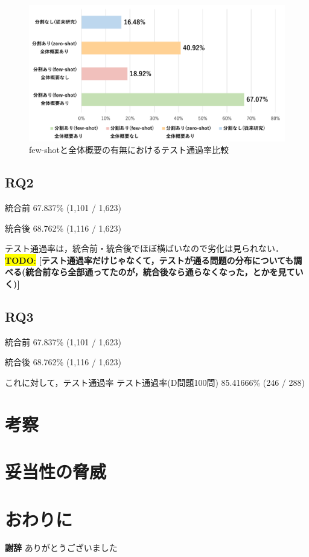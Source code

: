 \documentclass[submit,techrep,noauthor]{ipsj}
\newcommand{\todo}[1]{\colorbox{yellow}{{\bf TODO}:}{\color{red} {\textbf{[#1]}}}}
\begin{document}
\begin{figure}[t]
    \centering
    \includegraphics[width=1.0\linewidth]{./Toyoshima_fig/SIGSE_fig1.pdf}
    \caption{few-shotと全体概要の有無におけるテスト通過率比較\protect\footnotemark}
    \label{ses2025}
\end{figure}

\subsection{RQ2}
統合前
67.837\% (1,101 / 1,623)

統合後
68.762\% (1,116 / 1,623)

テスト通過率は，統合前・統合後でほぼ横ばいなので劣化は見られない．
\todo{テスト通過率だけじゃなくて，テストが通る問題の分布についても調べる(統合前なら全部通ってたのが，統合後なら通らなくなった，とかを見ていく)}

\subsection{RQ3}
統合前
67.837\% (1,101 / 1,623)

統合後
68.762\% (1,116 / 1,623)

これに対して，テスト通過率
テスト通過率(D問題100問)
85.41666\% (246 / 288)

\section{考察}

\section{妥当性の脅威}

\section{おわりに}
\textbf{謝辞} ありがとうございました



\end{document}
